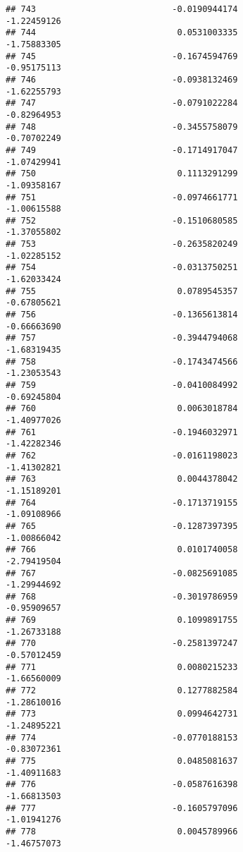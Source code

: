 \documentclass[
]{article}
\begin{document}
\begin{verbatim}
## 743                           -0.0190944174                -1.22459126
## 744                            0.0531003335                -1.75883305
## 745                           -0.1674594769                -0.95175113
## 746                           -0.0938132469                -1.62255793
## 747                           -0.0791022284                -0.82964953
## 748                           -0.3455758079                -0.70702249
## 749                           -0.1714917047                -1.07429941
## 750                            0.1113291299                -1.09358167
## 751                           -0.0974661771                -1.00615588
## 752                           -0.1510680585                -1.37055802
## 753                           -0.2635820249                -1.02285152
## 754                           -0.0313750251                -1.62033424
## 755                            0.0789545357                -0.67805621
## 756                           -0.1365613814                -0.66663690
## 757                           -0.3944794068                -1.68319435
## 758                           -0.1743474566                -1.23053543
## 759                           -0.0410084992                -0.69245804
## 760                            0.0063018784                -1.40977026
## 761                           -0.1946032971                -1.42282346
## 762                           -0.0161198023                -1.41302821
## 763                            0.0044378042                -1.15189201
## 764                           -0.1713719155                -1.09108966
## 765                           -0.1287397395                -1.00866042
## 766                            0.0101740058                -2.79419504
## 767                           -0.0825691085                -1.29944692
## 768                           -0.3019786959                -0.95909657
## 769                            0.1099891755                -1.26733188
## 770                           -0.2581397247                -0.57012459
## 771                            0.0080215233                -1.66560009
## 772                            0.1277882584                -1.28610016
## 773                            0.0994642731                -1.24895221
## 774                           -0.0770188153                -0.83072361
## 775                            0.0485081637                -1.40911683
## 776                           -0.0587616398                -1.66813503
## 777                           -0.1605797096                -1.01941276
## 778                            0.0045789966                -1.46757073

\end{verbatim}
\end{document}
